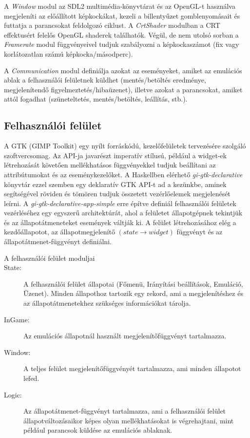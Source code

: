 A \emph{Window} modul az SDL2 multimédia-könyvtárat és az OpenGL-t használva megjeleníti az előállított képkockákat, kezeli a billentyűzet gomblenyomásait és futtatja a parancsokat feldolgozó ciklust. A \emph{CrtShader} modulban a CRT effektusért felelős OpenGL shaderek találhatók.
Végül, de nem utolsó sorban a \emph{Framerate} modul függvényeivel tudjuk szabályozni a képkockaszámot (fix vagy korlátozatlan számú képkocka/másodperc).

A \emph{Communication} modul definiálja azokat az eseményeket, amiket az emulációs ablak a felhasználói felületnek küldhet (mentés/betöltés eredménye, megjelenítendő figyelmeztetés/hibaüzenet), illetve azokat a parancsokat, amiket attól fogadhat (szüneteltetés, mentés/betöltés, leállítás, stb.).

\subsection{Felhasználói felület}

A GTK (GIMP Toolkit) egy nyílt forráskódú, kezelőfelületek tervezésére szolgáló szoftvercsomag.
Az API-ja javarészt imperatív stílusú, például a widget-ek létrehozását követően mellékhatásos függvényekkel tudjuk beállítani az attribútumokat és az eseménykezelőket. A Haskellben elérhető \emph{gi-gtk-declarative} könyvtár ezzel szemben egy deklaratív GTK API-t ad a kezünkbe, aminek segítségével röviden és tömören tudjuk összetett vezérlőelemek megjelenését leírni. 
A \emph{gi-gtk-declarative-app-simple} erre építve definiál felhasználói felületek vezérléséhez egy egyszerű architektúrát, ahol a felületet állapotgépnek tekintjük és az állapotátmeneteket események váltják ki. A felület létrehozásához elég a kezdőállapotot, az állapotmegjelenítő $(state \rightarrow widget)$ függvényt és az állapotátmenet-függvényt definiálni.

\begin{description}
	\item[A felhasználói felület moduljai]
	\item[State:]
	A felhasználói felület állapotai (Főmenü, Irányítási beállítások, Emuláció, Üzenet).
	Minden állapothoz tartozik egy rekord, ami a megjelenítéshez és az állapotátmenetekhez szükséges információkat tárolja.
	\item[InGame:]
	Az emulációs állapotnál használt megjelenítőfüggvényt tartalmazza.
	\item[Window:]
	A teljes felület megjelenítőfüggvényét tartalmazza, ami minden állapotot lefed.
	\item[Logic:]
	Az állapotátmenet-függvényt tartalmazza, ami a felhasználói felület állapotváltozásaikor képes olyan mellékhatásokat is végrehajtani, mint például parancsok küldése az emulációs ablaknak. 
\end{description}

